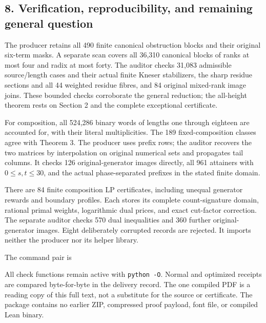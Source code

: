 \documentclass[11pt,a4paper]{article}
\newenvironment{Shaded}{}{}
\begin{document}
\subsection{8. Verification, reproducibility, and remaining general question}\label{eporig:verification-reproducibility-and-remaining-general-question}

The producer retains all 490 finite canonical obstruction blocks and their original six-term masks. A separate scan covers all 36,310 canonical blocks of ranks at most four and radix at most forty. The auditor checks 31,083 admissible source/length cases and their actual finite Kneser stabilizers, the sharp residue sections and all 44 weighted residue fibres, and 84 original mixed-rank image joins. These bounded checks corroborate the general reduction; the all-height theorem rests on Section 2 and the complete exceptional certificate.

For composition, all 524,286 binary words of lengths one through eighteen are accounted for, with their literal multiplicities. The 189 fixed-composition classes agree with Theorem 3. The producer uses prefix rows; the auditor recovers the two matrices by interpolation on original numerical sets and propagates tail columns. It checks 126 original-generator images directly, all 961 attainers with \(0\le s,t\le30\), and the actual phase-separated prefixes in the stated finite domain.

There are 84 finite composition LP certificates, including unequal generator rewards and boundary profiles. Each stores its complete count-signature domain, rational primal weights, logarithmic dual prices, and exact cut-factor correction. The separate auditor checks 570 dual inequalities and 360 further original-generator images. Eight deliberately corrupted records are rejected. It imports neither the producer nor its helper library.

The command pair is

\begin{Shaded}
\begin{Highlighting}[]
\end{Highlighting}
\end{Shaded}

All check functions remain active with \texttt{python\ -O}. Normal and optimized receipts are compared byte-for-byte in the delivery record. The one compiled PDF is a reading copy of this full text, not a substitute for the source or certificate. The package contains no earlier ZIP, compressed proof payload, font file, or compiled Lean binary.
\end{document}
